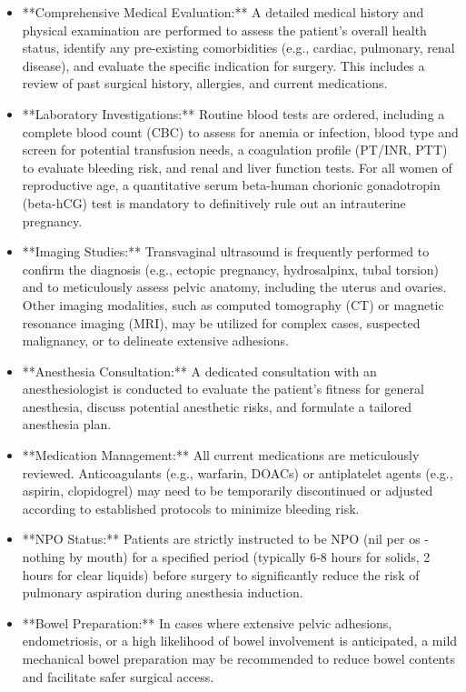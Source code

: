 \begin{itemize}
  \item **Comprehensive Medical Evaluation:** A detailed medical history and physical examination are performed to assess the patient's overall health status, identify any pre-existing comorbidities (e.g., cardiac, pulmonary, renal disease), and evaluate the specific indication for surgery. This includes a review of past surgical history, allergies, and current medications.
  \item **Laboratory Investigations:** Routine blood tests are ordered, including a complete blood count (CBC) to assess for anemia or infection, blood type and screen for potential transfusion needs, a coagulation profile (PT/INR, PTT) to evaluate bleeding risk, and renal and liver function tests. For all women of reproductive age, a quantitative serum beta-human chorionic gonadotropin (beta-hCG) test is mandatory to definitively rule out an intrauterine pregnancy.
  \item **Imaging Studies:** Transvaginal ultrasound is frequently performed to confirm the diagnosis (e.g., ectopic pregnancy, hydrosalpinx, tubal torsion) and to meticulously assess pelvic anatomy, including the uterus and ovaries. Other imaging modalities, such as computed tomography (CT) or magnetic resonance imaging (MRI), may be utilized for complex cases, suspected malignancy, or to delineate extensive adhesions.
  \item **Anesthesia Consultation:** A dedicated consultation with an anesthesiologist is conducted to evaluate the patient's fitness for general anesthesia, discuss potential anesthetic risks, and formulate a tailored anesthesia plan.
  \item **Medication Management:** All current medications are meticulously reviewed. Anticoagulants (e.g., warfarin, DOACs) or antiplatelet agents (e.g., aspirin, clopidogrel) may need to be temporarily discontinued or adjusted according to established protocols to minimize bleeding risk.
  \item **NPO Status:** Patients are strictly instructed to be NPO (nil per os - nothing by mouth) for a specified period (typically 6-8 hours for solids, 2 hours for clear liquids) before surgery to significantly reduce the risk of pulmonary aspiration during anesthesia induction.
  \item **Bowel Preparation:** In cases where extensive pelvic adhesions, endometriosis, or a high likelihood of bowel involvement is anticipated, a mild mechanical bowel preparation may be recommended to reduce bowel contents and facilitate safer surgical access.

\end{itemize}
